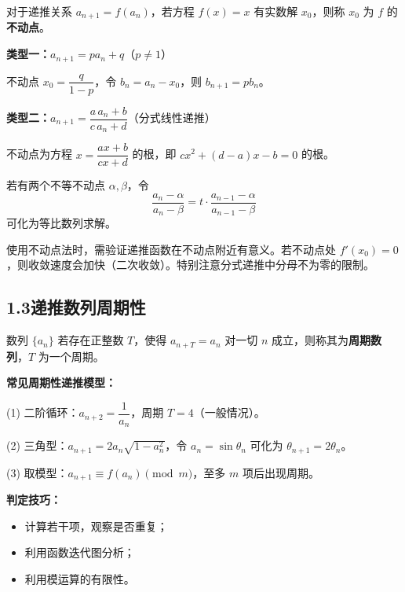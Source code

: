\documentclass[12pt, a4paper]{ctexart}
\begin{document}
\begin{knowledgebox}[不动点法]
对于递推关系 $a_{n+1} = f(a_n)$，若方程 $f(x) = x$ 有实数解 $x_0$，则称 $x_0$ 为 $f$ 的\textbf{不动点}。

\textbf{类型一：}$a_{n+1} = pa_n + q$（$p\neq 1$）

不动点 $x_0 = \dfrac{q}{1-p}$，令 $b_n = a_n - x_0$，则 $b_{n+1} = pb_n$。

\textbf{类型二：}$a_{n+1} = \dfrac{a\,a_n + b}{c\,a_n + d}$（分式线性递推）

不动点为方程 $x = \dfrac{ax+b}{cx+d}$ 的根，即 $cx^2 + (d-a)x - b = 0$ 的根。

若有两个不等不动点 $\alpha, \beta$，令
\[
\frac{a_n - \alpha}{a_n - \beta} = t \cdot \frac{a_{n-1} - \alpha}{a_{n-1} - \beta}
\]
可化为等比数列求解。
\end{knowledgebox}

\begin{warnbox}[易错提醒]
使用不动点法时，需验证递推函数在不动点附近有意义。若不动点处 $f'(x_0) = 0$，则收敛速度会加快（二次收敛）。特别注意分式递推中分母不为零的限制。
\end{warnbox}

\subsection*{1.3\quad 递推数列周期性}

\begin{knowledgebox}[周期数列的判定]
数列 $\{a_n\}$ 若存在正整数 $T$，使得 $a_{n+T} = a_n$ 对一切 $n$ 成立，则称其为\textbf{周期数列}，$T$ 为一个周期。

\textbf{常见周期性递推模型：}

(1) 二阶循环：$a_{n+2} = \dfrac{1}{a_n}$，周期 $T=4$（一般情况）。

(2) 三角型：$a_{n+1} = 2a_n\sqrt{1-a_n^2}$，令 $a_n = \sin\theta_n$ 可化为 $\theta_{n+1} = 2\theta_n$。

(3) 取模型：$a_{n+1} \equiv f(a_n) \pmod{m}$，至多 $m$ 项后出现周期。

\textbf{判定技巧：}
\begin{itemize}[nosep]
\item 计算若干项，观察是否重复；
\item 利用函数迭代图分析；
\item 利用模运算的有限性。
\end{itemize}
\end{knowledgebox}
\end{document}
